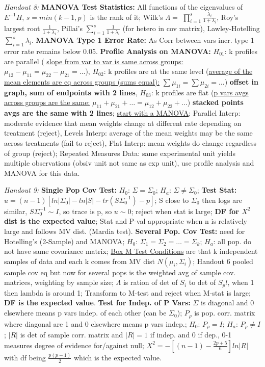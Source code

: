 \documentclass[9pt]{extarticle}
\begin{document}
\textit{Handout 8:}
\textbf{MANOVA Test Statistics:} All functions of the eigenvalues of $E^{-1}H$, 
$s = min(k-1, p)$ is the rank of it; Wilk's $\Lambda = $ $\prod_{i=1}^s 
\frac{\lambda_i}{1 + \lambda_i}$, Roy's largest root $\frac{1}{1 + \lambda_1}$, 
Pillai's $\sum_{i=1}^s \frac{1}{1 + \lambda_i}$ (for hetero in cov matrix), 
Lawley-Hotelling $\sum_{i=1}^s \lambda_i$.
\textbf{MANOVA Type 1 Error Rate:} As Corr between vars incr. type 1 error rate 
remains below 0.05.
\textbf{Profile Analysis on MANOVA:} $H_{01}$: k profiles are parallel (
\underline{slope from var to var is same across groups:} $\mu_{12} - \mu_{11} =
\mu_{22} - \mu_{21} = \dots$), $H_{02}$: k profiles are at the same level 
(\underline{average of the mean elements are eq across groups (sums equal):}
$\sum \mu_{1i} = \sum \mu_{2i} = \dots$) \textbf{offset in graph, sum of 
endpoints with 2 lines}, $H_{03}$: k profiles are flat (\underline{p vars avgs 
across groups are the same:} $\mu_{11} + \mu_{21} + \dots = \mu_{12} + 
\mu_{22} + \dots$) \textbf{stacked points avgs are the same with 2 lines}; 
\underline{start with a MANOVA}; Parallel Interp: moderate evidence that mean 
weights change at different rate depending on treatment (reject), Levels Interp: 
average of the mean weights may be the same across treatments (fail to reject), 
Flat Interp: mean weights do change regardless of group (reject); Repeated 
Measures Data: same experimental unit yields multiple observations (obsiv unit 
not same as exp unit), use profile analysis and MANOVA for this data.

\textit{Handout 9:}
\textbf{Single Pop Cov Test:} $H_0$: $\Sigma = \Sigma_0$; $H_a$: $\Sigma \neq
\Sigma_0$; \textbf{Test Stat:} $u = (n - 1)[ln|\Sigma_0| - ln|S| - tr(S
\Sigma_0^{-1}) - p]$; S close to $\Sigma_0$ then logs are similar, $S\Sigma_0^{-1}
\sim I$, so trace is p, so $u \sim 0$; reject when stat is large; \textbf{DF 
for $X^2$ dist is the expected value}; Stat and P-val appropriate when n is 
relatively large and follows MV dist. (Mardia test).
\textbf{Several Pop. Cov Test:} need for Hotelling's (2-Sample) and MANOVA;
$H_0$: $\Sigma_1 = \Sigma_2 = \dots = \Sigma_k$; $H_a$: all pop. do not have 
same covariance matrix; \underline{Box M Test Conditions} are that k independent 
samples of data and each k comes from MV dist $N(\mu_i, \Sigma_i)$; Handout 6 
pooled sample cov eq but now for several pops is the weighted avg of sample cov. 
matrices, weighting by sample size; $\Lambda$ is ration of det of $S_i$ to det 
of $S_pl$, when 1 then lambda is around 1; Transform to M-test and reject when 
M-stat is large; \textbf{DF is the expected value}.
\textbf{Test for Indep. of P Vars:} $\Sigma$ is diagonal and 0 elsewhere means 
p vars indep. of each other (can be $\Sigma_0$); $P_\rho$ is pop. corr. matrix 
where diagonal are 1 and 0 elsewhere means p vars indep.; $H_0$: $P_\rho = I$;
$H_a$: $P_\rho \neq I$; $|R|$ is det of sample corr. matrix and $|R| = 1$ if 
indep. and 0 if dep., 0-1 measures degree of evidence for/against null; 
$X^2 = -[(n-1) - \frac{2p + 5}{6}]ln|R|$ with df being $\frac{p(p-1)}{2}$ which 
is the expected value.\\
\end{document}
